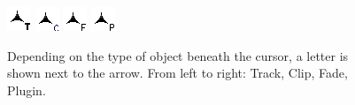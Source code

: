 \begin{figure}[htb]
 \centering
 \includegraphics[height=2\baselineskip]{../images/cursorFloatOverTrack.png}\qquad
 \includegraphics[height=2\baselineskip]{../images/cursorFloatOverClip.png}\qquad
 \includegraphics[height=2\baselineskip]{../images/cursorFloatOverFade.png}\qquad
 \includegraphics[height=2\baselineskip]{../images/cursorFloatOverPlugin.png}
 \caption{Depending on the type of object beneath the cursor, a letter is shown next to the arrow. From left to right: Track, Clip, Fade, Plugin.}
 \label{fig_cursor}
\end{figure}
